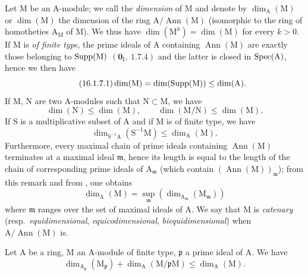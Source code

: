 \begin{env}[16.1.7]
\label{0.16.1.7}
Let $\mathrm{M}$ be an $\mathrm{A}$-module; we call the \emph{dimension} of $\mathrm{M}$ and denote by $\dim_\mathrm{A}(\mathrm{M})$ or $\dim(\mathrm{M})$ the dimension of the ring $\mathrm{A}/\operatorname{Ann}(\mathrm{M})$ (isomorphic to the ring of homotheties $\mathrm{A}_\mathrm{M}$ of $\mathrm{M}$).
We thus have $\dim(\mathrm{M}^k)=\dim(\mathrm{M})$ for every $k>0$.
If $\mathrm{M}$ is \emph{of finite type}, the prime ideals of $\mathrm{A}$ containing $\operatorname{Ann}(\mathrm{M})$ are exactly those belonging to $\operatorname{Supp}(\mathrm{M})$ $(\mathbf{0}_\mathrm{I},~1.7.4)$ and the latter is closed in $\operatorname{Spec}(\mathrm{A})$, hence we then have
\begin{equation}
\label{0.16.1.7.1}
\tag{16.1.7.1}
  \dim(\mathrm{M})=\dim(\operatorname{Supp}(\mathrm{M}))\leq\dim(\mathrm{A}).
\end{equation}
If $\mathrm{M}$, $\mathrm{N}$ are two $\mathrm{A}$-modules such that $\mathrm{N}\subset\mathrm{M}$, we have
\begin{equation}
\label{0.16.1.7.2}
\tag{16.1.7.2}
  \dim(\mathrm{N})\leq\dim(\mathrm{M}),\qquad\dim(\mathrm{M}/\mathrm{N})\leq\dim(\mathrm{M}).
\end{equation}
If $\mathrm{S}$ is a multiplicative subset of $\mathrm{A}$ and if $\mathrm{M}$ is of finite type, we have
\begin{equation}
\label{0.16.1.7.3}
\tag{16.1.7.3}
  \dim_{\mathrm{S}^{-1}\mathrm{A}}(\mathrm{S}^{-1}\mathrm{M})\leq\dim_\mathrm{A}(\mathrm{M}).
\end{equation}
Furthermore, every maximal chain of prime ideals containing $\operatorname{Ann}(\mathrm{M})$ terminates at a maximal ideal $\mathfrak{m}$, hence its length is equal to the length of the chain of corresponding prime ideals of $\mathrm{A}_\mathfrak{m}$ (which contain $(\operatorname{Ann}(\mathrm{M}))_\mathfrak{m}$); from this remark and from , one obtains
\begin{equation}
\label{0.16.1.7.4}
\tag{16.1.7.4}
  \dim_\mathrm{A}(\mathrm{M})=\sup_\mathfrak{m}(\dim_{\mathrm{A}_\mathfrak{m}}(\mathrm{M}_\mathfrak{m}))
\end{equation}
where $\mathfrak{m}$ ranges over the set of maximal ideals of $\mathrm{A}$.
We say that $\mathrm{M}$ is \emph{catenary} (resp.~\emph{equidimensional}, \emph{equicodimensional}, \emph{biequidimensional}) when $\mathrm{A}/\operatorname{Ann}(\mathrm{M})$ is.
\end{env}

\begin{proposition}[16.1.8]
\label{0.16.1.8}
Let $\mathrm{A}$ be a ring, $\mathrm{M}$ an $\mathrm{A}$-module of finite type, $\mathfrak{p}$ a prime ideal of $\mathrm{A}$.
We have
\begin{equation}
\label{0.16.1.8.1}
\tag{16.1.8.1}
  \dim_{\mathrm{A}_\mathfrak{p}}(\mathrm{M}_\mathfrak{p})+\dim_\mathrm{A}(\mathrm{M}/\mathfrak{p}\mathrm{M})\leq\dim_\mathrm{A}(\mathrm{M}).
\end{equation}
\end{proposition}

